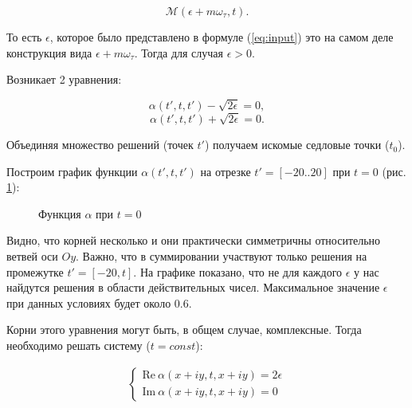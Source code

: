 \documentclass[%
bachelor,    %
natbib,      %
subf,        %
href,        %
colorlinks,  %
]{disser}
\renewcommand{\Re}{\mathrm{Re}}
\renewcommand{\Im}{\mathrm{Im}}
\newcommand{\cM}{\mathcal{M}}
\begin{document}
$$
\cM(\epsilon+m\omega_\tau,t).
$$

То есть $\epsilon$, которое было представлено в формуле (\ref{eq:input}) это на самом деле конструкция вида $\epsilon+m\omega_\tau$. Тогда для случая $\epsilon > 0$.

Возникает 2 уравнения:

$$\alpha(t', t, t') - \sqrt{2\epsilon} = 0,$$
$$\alpha(t', t, t') + \sqrt{2\epsilon} = 0.$$

Объединяя множество решений (точек $t'$) получаем искомые седловые точки ($t_0$).

Построим график функции $\alpha(t', t, t')$ на отрезке $t' = [-20..20]$ при $t = 0$ (рис. \ref{ris:alpha-20..0}):

\begin{figure}[h]
	\caption{Функция $\alpha$ при $t = 0$}
	\label{ris:alpha-20..0}
\end{figure}

Видно, что корней несколько и они практически симметричны относительно ветвей оси $O y$. Важно, что в суммировании участвуют только решения на промежутке $t' = [-20, t]$. 
На графике показано, что не для каждого $\epsilon$ у нас найдутся решения в области действительных чисел. Максимальное значение $\epsilon$ при данных условиях будет около 0.6.

Корни этого уравнения могут быть, в общем случае, комплексные. Тогда необходимо решать систему ($t = const$):

\begin{eqnarray}
\begin{cases}
\Re \ \alpha(x+i y, t, x+i y) = 2\epsilon \nonumber\\
\Im \ \alpha(x+i y, t, x+i y) = 0 \nonumber
\end{cases}
\end{eqnarray}
\end{document}
